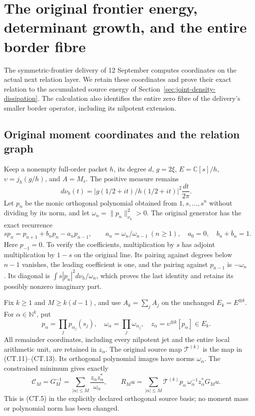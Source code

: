 \section{The original frontier energy, determinant growth, and the entire border fibre}
\label{sec:frontier-energy-dissipation}

The symmetric-frontier delivery of 12 September computes coordinates on
the actual next relation layer.  We retain these coordinates and prove
their exact relation to the accumulated source energy of
Section~\ref{sec:joint-density-dissipation}.  The calculation also
identifies the entire zero fibre of the delivery's smaller border
operator, including its nilpotent extension.

\subsection{Original moment coordinates and the relation graph}

Keep a nonempty full-order packet \(h\), its degree \(d\),
\(g=2\xi\), \(E=\mathbb C[s]/h\),
\(\upsilon=j_h(g/h)\), and \(A=M_s\).  The positive measure
remains
\[
 d\nu_h(t)=|g(1/2+it)/h(1/2+it)|^2\frac{dt}{2\pi}.
\]
Let \(p_n\) be the monic orthogonal polynomial obtained from
\(1,s,\ldots,s^n\) without dividing by its norm, and let
\(\omega_n=\|p_n\|_{\nu_h}^2>0\).
The original generator has the exact recurrence
\[
 sp_n=p_{n+1}+b_np_n-a_np_{n-1},\qquad
 a_n=\omega_n/\omega_{n-1}\ (n\ge1),\quad a_0=0,
 \quad b_n+\overline b_n=1.                              \tag{FE.1}
\]
Here \(p_{-1}=0\).  To verify the coefficients, multiplication
by \(s\) has adjoint multiplication by \(1-s\) on the
original line.  Its pairing against degrees below \(n-1\)
vanishes, the leading coefficient is one, and the pairing against
\(p_{n-1}\) is \(-\omega_n\).  Its diagonal is
\(\int s|p_n|^2d\nu_h/\omega_n\), which proves the last
identity and retains its possibly nonzero imaginary part.

Fix \(k\ge1\) and \(M\ge k(d-1)\), and use
\(A_k=\sum_jA_j\) on the unchanged \(E_k=E^{\otimes k}\).
For \(\alpha\in\mathbb N^k\), put
\[
 p_\alpha=\prod_jp_{\alpha_j}(s_j),\quad
 \omega_\alpha=\prod_j\omega_{\alpha_j},\quad
 z_\alpha=\upsilon^{\otimes k}[p_\alpha]\in E_k.
\]
All remainder coordinates, including every nilpotent jet and the
entire local arithmetic unit, are retained in \(z_\alpha\).
The original source map \(\mathcal T^{(k)}\) is the map
in (CT.11)--(CT.13).  Its orthogonal polynomial images have norms
\(\omega_\alpha\).  The constrained minimum gives exactly
\[
 \mathcal C_M=G_M^{-1}=
     \sum_{|\alpha|\le M}\frac{z_\alpha z_\alpha^*}{\omega_\alpha},
 \qquad
 R_Mu=\sum_{|\alpha|\le M}
       \mathcal T^{(k)}p_\alpha\,
                  \omega_\alpha^{-1}z_\alpha^*G_Mu.
 \tag{FE.2}
\]
This is (CT.5) in the explicitly declared orthogonal source basis;
no moment mass or polynomial norm has been changed.

